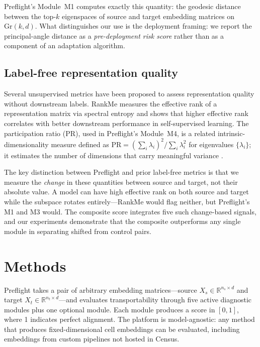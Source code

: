 \documentclass[11pt,letterpaper]{article}
\newcommand{\Gr}{\mathrm{Gr}}
\newcommand{\R}{\mathbb{R}}
\begin{document}
Preflight's Module~M1 computes exactly this quantity: the geodesic distance between the top-$k$ eigenspaces of source and target embedding matrices on $\Gr(k, d)$. What distinguishes our use is the deployment framing: we report the principal-angle distance as a \emph{pre-deployment risk score} rather than as a component of an adaptation algorithm.

\subsection{Label-free representation quality}

Several unsupervised metrics have been proposed to assess representation quality without downstream labels. RankMe \citep{garrido2023rankme} measures the effective rank of a representation matrix via spectral entropy and shows that higher effective rank correlates with better downstream performance in self-supervised learning. The participation ratio (PR), used in Preflight's Module~M4, is a related intrinsic-dimensionality measure defined as $\mathrm{PR} = (\sum_i \lambda_i)^2 / \sum_i \lambda_i^2$ for eigenvalues $\{\lambda_i\}$; it estimates the number of dimensions that carry meaningful variance \citep{vyas2020dimensionality}.

The key distinction between Preflight and prior label-free metrics is that we measure the \emph{change} in these quantities between source and target, not their absolute value. A model can have high effective rank on both source and target while the subspace rotates entirely---RankMe would flag neither, but Preflight's M1 and M3 would. The composite score integrates five such change-based signals, and our experiments demonstrate that the composite outperforms any single module in separating shifted from control pairs.


\section{Methods}
\label{sec:methods}

Preflight takes a pair of arbitrary embedding matrices---source $X_s \in \R^{n_s \times d}$ and target $X_t \in \R^{n_t \times d}$---and evaluates transportability through five active diagnostic modules plus one optional module. Each module produces a score in $[0, 1]$, where 1 indicates perfect alignment. The platform is model-agnostic: any method that produces fixed-dimensional cell embeddings can be evaluated, including embeddings from custom pipelines not hosted in Census.
\end{document}
